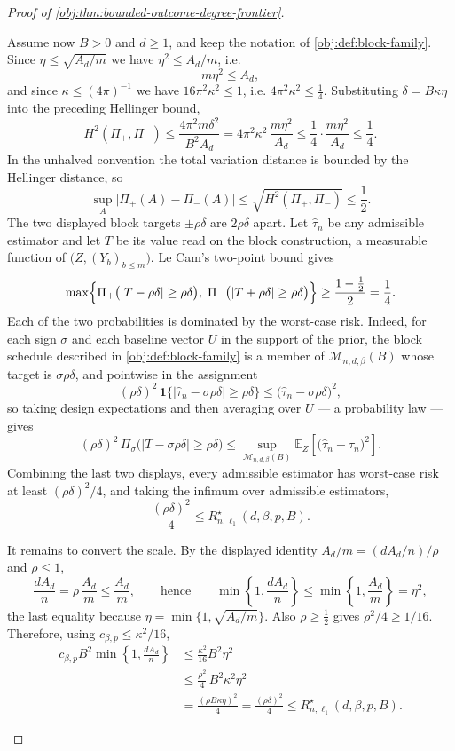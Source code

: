 \documentclass[11pt]{article}
\begin{document}
\begin{proof}[Proof of \cref{obj:thm:bounded-outcome-degree-frontier}]
\begin{enumerate}
Assume now \(B>0\) and \(d\ge1\), and keep the notation of
\cref{obj:def:block-family}.  Since
\(\eta\le\sqrt{A_d/m}\) we have \(\eta^2\le A_d/m\), i.e.
\[
m\eta^2\le A_d ,
\]
and since \(\kappa\le(4\pi)^{-1}\) we have \(16\pi^2\kappa^2\le1\), i.e.
\(4\pi^2\kappa^2\le\tfrac14\).  Substituting \(\delta=B\kappa\eta\) into the preceding Hellinger bound,
\[
H^2(\Pi_+,\Pi_-)
\le
\frac{4\pi^2m\delta^2}{B^2A_d}
=
4\pi^2\kappa^2\,\frac{m\eta^2}{A_d}
\le
\frac14\cdot\frac{m\eta^2}{A_d}
\le
\frac14 .
\]
In the unhalved convention the total variation distance is bounded by the
Hellinger distance, so
\[
\sup_{A}\bigl|\Pi_+(A)-\Pi_-(A)\bigr|
\le
\sqrt{H^2(\Pi_+,\Pi_-)}
\le
\frac12 .
\]
The two displayed block targets \(\pm\rho\delta\) are \(2\rho\delta\) apart.  Let
\(\widehat\tau_n\) be any admissible estimator and let \(T\) be its value read on
the block construction, a measurable function of \(\bigl(Z,(Y_b)_{b\le m}\bigr)\).
Le Cam's two-point bound gives
\[
\max\Bigl\{
\Pi_+\bigl(|T-\rho\delta|\ge\rho\delta\bigr),
\;
\Pi_-\bigl(|T+\rho\delta|\ge\rho\delta\bigr)
\Bigr\}
\ge
\frac{1-\tfrac12}{2}
=
\frac14 .
\]
Each of the two probabilities is dominated by the worst-case risk.  Indeed, for
each sign \(\sigma\) and each baseline vector \(U\) in the support of the prior,
the block schedule described in \cref{obj:def:block-family} is a member of
\(\mathcal M_{n,d,\beta}(B)\) whose target is
\(\sigma\rho\delta\), and pointwise in the assignment
\[
(\rho\delta)^2\,\mathbf 1\bigl\{|\widehat\tau_n-\sigma\rho\delta|\ge\rho\delta\bigr\}
\le
\bigl(\widehat\tau_n-\sigma\rho\delta\bigr)^2 ,
\]
so taking design expectations and then averaging over \(U\) — a probability law —
gives
\[
(\rho\delta)^2\,
\Pi_\sigma\bigl(|T-\sigma\rho\delta|\ge\rho\delta\bigr)
\le
\sup_{\mathcal M_{n,d,\beta}(B)}
\mathbb E_Z\!\left[\bigl(\widehat\tau_n-\tau_n\bigr)^2\right].
\]
Combining the last two displays, every admissible estimator has worst-case risk
at least \((\rho\delta)^2/4\), and taking the infimum over admissible estimators,
\[
\frac{(\rho\delta)^2}{4}
\le
R_{n,\ell_1}^{\star}(d,\beta,p,B).
\]

It remains to convert the scale.  By the displayed identity
\(A_d/m=(dA_d/n)/\rho\) and \(\rho\le1\),
\[
\frac{dA_d}{n}=\rho\,\frac{A_d}{m}\le\frac{A_d}{m},
\qquad\text{hence}\qquad
\min\!\left\{1,\frac{dA_d}{n}\right\}
\le
\min\!\left\{1,\frac{A_d}{m}\right\}
=\eta^2 ,
\]
the last equality because \(\eta=\min\{1,\sqrt{A_d/m}\}\).  Also \(\rho\ge\tfrac12\)
gives \(\rho^2/4\ge1/16\).  Therefore, using \(c_{\beta,p}\le\kappa^2/16\),
\[
\begin{aligned}
c_{\beta,p}B^2\min\!\left\{1,\frac{dA_d}{n}\right\}
&\le
\frac{\kappa^2}{16}B^2\eta^2\\
&\le
\frac{\rho^2}{4}\,B^2\kappa^2\eta^2\\
&=
\frac{(\rho B\kappa\eta)^2}{4}
=
\frac{(\rho\delta)^2}{4}
\le
R_{n,\ell_1}^{\star}(d,\beta,p,B).
\end{aligned}
\]


\end{enumerate}
\end{proof}
\end{document}
